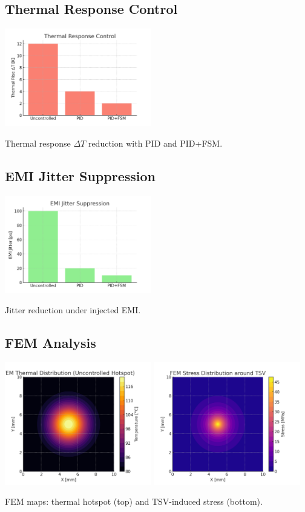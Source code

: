 \documentclass[conference]{IEEEtran}
\begin{document}
\subsection{Thermal Response Control}
\includegraphics[width=0.48\textwidth]{figs/sim_thermal_response.png}
\caption{Thermal response $\Delta T$ reduction with PID and PID+FSM.}

\subsection{EMI Jitter Suppression}
\includegraphics[width=0.48\textwidth]{figs/sim_emi_jitter.png}
\caption{Jitter reduction under injected EMI.}

\subsection{FEM Analysis}
\includegraphics[width=0.48\textwidth]{figs/fem_thermal_map.png}
\includegraphics[width=0.48\textwidth]{figs/fem_stress_map.png}
\caption{FEM maps: thermal hotspot (top) and TSV-induced stress (bottom).}
\end{document}
